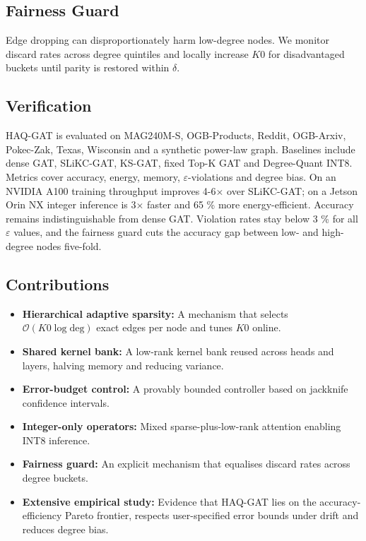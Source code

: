 \documentclass{article} %
\begin{document}
\subsection{Fairness Guard}
Edge dropping can disproportionately harm low-degree nodes. We monitor discard rates across degree quintiles and locally increase \(K0\) for disadvantaged buckets until parity is restored within \(\delta\).

\subsection{Verification}
HAQ-GAT is evaluated on MAG240M-S, OGB-Products, Reddit, OGB-Arxiv, Pokec-Zak, Texas, Wisconsin and a synthetic power-law graph. Baselines include dense GAT, SLiKC-GAT, KS-GAT, fixed Top-K GAT and Degree-Quant INT8. Metrics cover accuracy, energy, memory, \(\varepsilon\)-violations and degree bias. On an NVIDIA A100 training throughput improves 4-6\(\times\) over SLiKC-GAT; on a Jetson Orin NX integer inference is 3\(\times\) faster and 65 \% more energy-efficient. Accuracy remains indistinguishable from dense GAT. Violation rates stay below 3 \% for all \(\varepsilon\) values, and the fairness guard cuts the accuracy gap between low- and high-degree nodes five-fold.

\subsection{Contributions}
\begin{itemize}
  \item \textbf{Hierarchical adaptive sparsity:} A mechanism that selects \(\mathcal{O}(K0 \log \mathrm{deg})\) exact edges per node and tunes \(K0\) online.
  \item \textbf{Shared kernel bank:} A low-rank kernel bank reused across heads and layers, halving memory and reducing variance.
  \item \textbf{Error-budget control:} A provably bounded controller based on jackknife confidence intervals.
  \item \textbf{Integer-only operators:} Mixed sparse-plus-low-rank attention enabling INT8 inference.
  \item \textbf{Fairness guard:} An explicit mechanism that equalises discard rates across degree buckets.
  \item \textbf{Extensive empirical study:} Evidence that HAQ-GAT lies on the accuracy-efficiency Pareto frontier, respects user-specified error bounds under drift and reduces degree bias.
\end{itemize}
\end{document}
